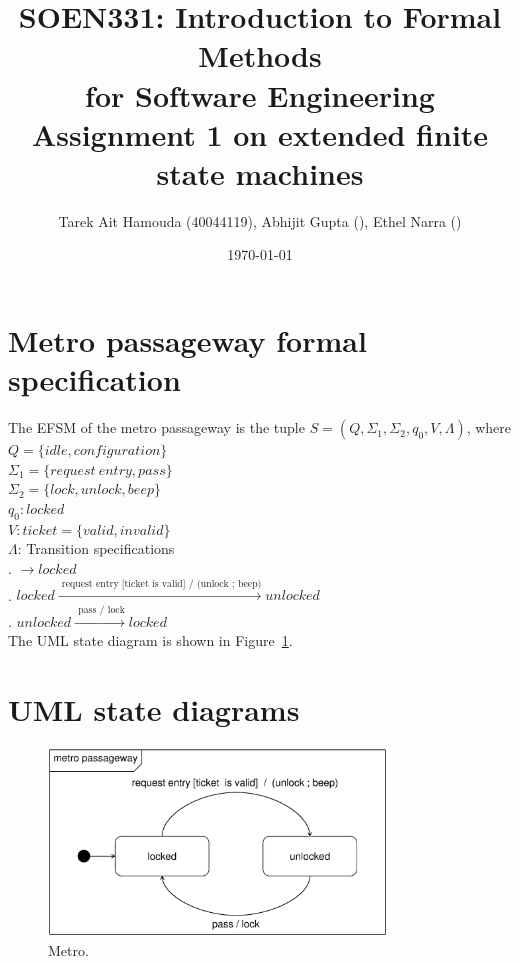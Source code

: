 \documentclass[12pt]{article}
\title{SOEN331: Introduction to Formal Methods\\for Software Engineering\\
Assignment 1 on extended finite state machines}
\author{Tarek Ait Hamouda (40044119), Abhijit Gupta (), Ethel Narra ()}
\date{\today}
\begin{document}
\begin{spacing}{1.5}

\maketitle

\section{Metro passageway formal specification}

\noindent The EFSM of the metro passageway is the tuple $S = (Q, \Sigma_1, \Sigma_2, q_0, V, \Lambda)$, where\\

\noindent $Q = \{idle, configuration\}$\\
\noindent $\Sigma_1 = \{request~entry, pass\}$\\
\noindent $\Sigma_2 = \{lock, unlock, beep\}$\\
\noindent $q_0: locked$\\
\noindent $V: ticket = \{valid, invalid\}$\\
\noindent $\Lambda$: Transition specifications\\
. $\rightarrow locked$\\
. $locked \xrightarrow {\text { request entry [ticket is valid] / (unlock ; beep)}} unlocked$\\
. $unlocked \xrightarrow {\text { pass / lock}} locked$\\

\noindent The UML state diagram is shown in Figure~\ref{fig:metro-fig}.

\newpage

\section{UML state diagrams}

\begin{figure}[h!]
	\centering
		\includegraphics[width=0.8\textwidth]{./figures/eps/metro.eps}
		  \caption{Metro.}
  \label{fig:metro-fig}
\end{figure}

\end{spacing}
\end{document}

